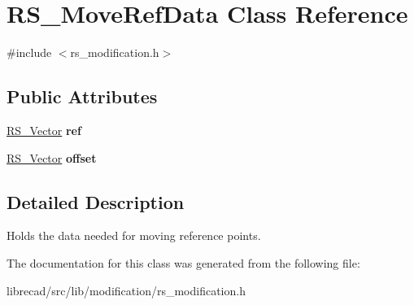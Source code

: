 \hypertarget{classRS__MoveRefData}{\section{R\-S\-\_\-\-Move\-Ref\-Data Class Reference}
\label{classRS__MoveRefData}
}


{\ttfamily \#include $<$rs\-\_\-modification.\-h$>$}

\subsection*{Public Attributes}
\begin{DoxyCompactItemize}
\item 
\hypertarget{classRS__MoveRefData_ab028dfa31392f4b84b23c6af7d1c24d2}{\hyperlink{classRS__Vector}{R\-S\-\_\-\-Vector} {\bfseries ref}}\label{classRS__MoveRefData_ab028dfa31392f4b84b23c6af7d1c24d2}

\item 
\hypertarget{classRS__MoveRefData_a8d8e67f59c39b3cbddd4dd91832dbb39}{\hyperlink{classRS__Vector}{R\-S\-\_\-\-Vector} {\bfseries offset}}\label{classRS__MoveRefData_a8d8e67f59c39b3cbddd4dd91832dbb39}

\end{DoxyCompactItemize}


\subsection{Detailed Description}
Holds the data needed for moving reference points. 

The documentation for this class was generated from the following file\-:\begin{DoxyCompactItemize}
\item 
librecad/src/lib/modification/rs\-\_\-modification.\-h\end{DoxyCompactItemize}
